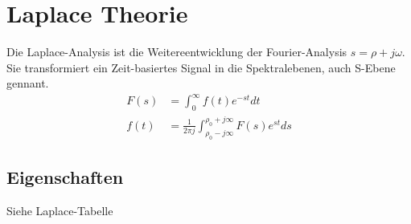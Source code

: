 \section{Laplace Theorie}
Die Laplace-Analysis ist die Weitereentwicklung der Fourier-Analysis $s = \rho + j\omega$. Sie transformiert ein Zeit-basiertes Signal in die Spektralebenen, auch S-Ebene gennant.
\begin{align*}
	F(s) &= \int_{0}^{\infty}f(t)e^{-st}dt \\
	f(t) &= \frac{1}{2\pi j}\int_{\rho_0 - j\infty}^{\rho_0 + j \infty}F(s)e^{st}ds
\end{align*}

\subsection{Eigenschaften}
Siehe Laplace-Tabelle

